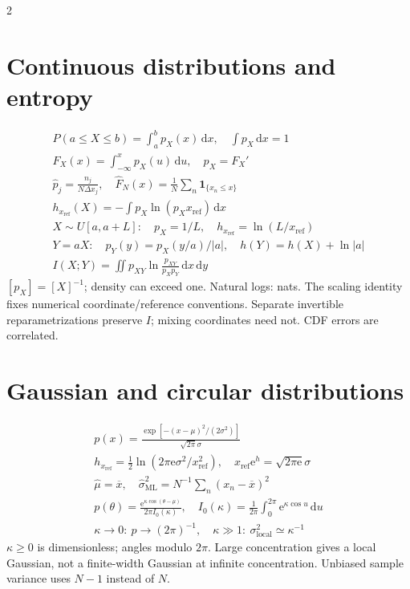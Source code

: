 \documentclass[10pt,a4paper]{scrartcl}
\newcommand{\dd}{\mathrm{d}}
\newcommand{\ee}{\mathrm{e}}
\begin{document}
\begin{multicols}{2}
\section*{Continuous distributions and entropy}
\begin{gather*}
P(a\le X\le b)=\int_a^bp_X(x)\,\dd x,\quad \int p_X\,\dd x=1\\
F_X(x)=\int_{-\infty}^xp_X(u)\,\dd u,\quad p_X=F_X'\\
\widehat p_j=\frac{n_j}{N\Delta x_j},\quad
\widehat F_N(x)=\frac1N\sum_n\mathbf1_{\{x_n\le x\}}\\
h_{x_{\mathrm{ref}}}(X)=-\int p_X\ln(p_Xx_{\mathrm{ref}})\,\dd x\\
X\sim U[a,a+L]:\quad p_X=1/L,\quad h_{x_{\mathrm{ref}}}=\ln(L/x_{\mathrm{ref}})\\
Y=aX:\quad p_Y(y)=p_X(y/a)/|a|,\quad h(Y)=h(X)+\ln|a|\\
I(X;Y)=\iint p_{XY}\ln\frac{p_{XY}}{p_Xp_Y}\,\dd x\,\dd y
\end{gather*}
$[p_X]=[X]^{-1}$; density can exceed one. Natural logs: nats. The scaling identity fixes numerical coordinate/reference conventions. Separate invertible reparametrizations preserve $I$; mixing coordinates need not. CDF errors are correlated.

\section*{Gaussian and circular distributions}
\begin{gather*}
p(x)=\frac{\exp[-(x-\mu)^2/(2\sigma^2)]}{\sqrt{2\pi}\sigma}\\
h_{x_{\mathrm{ref}}}=\tfrac12\ln(2\pi\ee\sigma^2/x_{\mathrm{ref}}^2),\quad
x_{\mathrm{ref}}\ee^h=\sqrt{2\pi\ee}\sigma\\
\widehat\mu=\overline x,\quad\widehat\sigma^2_{\mathrm{ML}}=N^{-1}\sum_n(x_n-\overline x)^2\\
p(\theta)=\frac{\ee^{\kappa\cos(\theta-\mu)}}{2\pi I_0(\kappa)},\quad
I_0(\kappa)=\frac1{2\pi}\int_0^{2\pi}\ee^{\kappa\cos u}\,\dd u\\
\kappa\to0:\ p\to(2\pi)^{-1},\quad
\kappa\gg1:\ \sigma^2_{\mathrm{local}}\simeq\kappa^{-1}
\end{gather*}
$\kappa\ge0$ is dimensionless; angles modulo $2\pi$. Large concentration gives a local Gaussian, not a finite-width Gaussian at infinite concentration. Unbiased sample variance uses $N-1$ instead of $N$.


\end{multicols}
\end{document}
